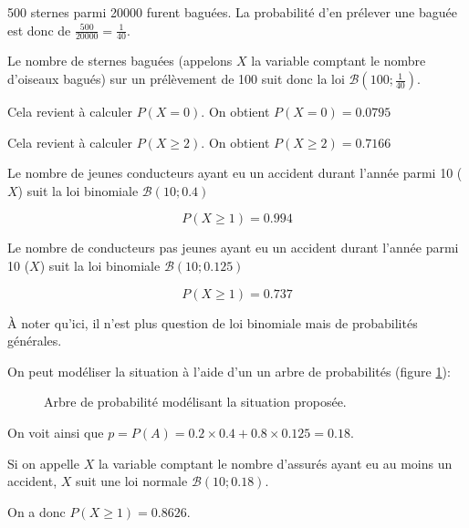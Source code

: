 \documentclass[a4paper,12pt]{scrartcl}
\begin{document}
500 sternes parmi 20000 furent baguées. La probabilité d'en prélever une baguée est donc de $\frac{500}{20000} = \frac{1}{40}$. 

Le nombre de sternes baguées (appelons $X$ la variable comptant le nombre d'oiseaux bagués) sur un prélèvement de 100 suit donc la loi $\mathcal{B}\left( 100 ; \frac{1}{40}\right)$.

\question{}
Cela revient à calculer $P(X=0)$. On obtient $P(X=0) = 0.0795$

\question{}
Cela revient à calculer $P(X \geqslant 2)$. On obtient $P(X \geqslant 2) = 0.7166$


\question{}
Le nombre de jeunes conducteurs ayant eu un accident durant l'année parmi 10 ($X$) suit la loi binomiale $\mathcal{B}\left(10 ; 0.4\right)$

\begin{equation*}
 P(X \geqslant 1) = 0.994
\end{equation*}


\question{}
Le nombre de conducteurs pas jeunes ayant eu un accident durant l'année parmi 10 ($X$) suit la loi binomiale $\mathcal{B}\left(10 ; 0.125\right)$

\begin{equation*}
 P(X \geqslant 1) = 0.737
\end{equation*}

\question{}

\subquestion{}
À noter qu'ici, il n'est plus question de loi binomiale mais de probabilités générales.

On peut modéliser la situation à l'aide d'un un arbre de probabilités (figure \ref{fig:tree}):

\begin{figure}[h]
\begin{center}
\end{center}
\caption{Arbre de probabilité modélisant la situation proposée.}
\label{fig:tree}
\end{figure}

On voit ainsi que $p = P(A) = 0.2 \times 0.4 + 0.8 \times 0.125 = 0.18$.

\subquestion{}
Si on appelle $X$ la variable comptant le nombre d'assurés ayant eu au moins un accident, $X$ suit une loi normale $\mathcal{B}\left( 10 ; 0.18 \right)$. 

On a donc $P(X \geqslant 1) = 0.8626$.
\end{document}

